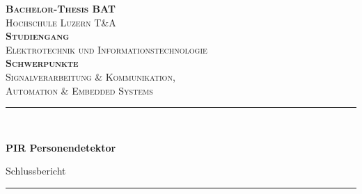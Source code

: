 \begin{titlepage}	
	\begin{center}	
		
		\textsc{\bfseries \LARGE Bachelor-Thesis BAT }\\[1.0cm]
		
		\textsc{\Large Hochschule Luzern T\&A}\\[0.5cm]
		
			\textsc{\bfseries Studiengang}\\[0.2cm]
		
		\textsc{
			Elektrotechnik und Informationstechnologie}\\[0.2cm]
		
				\textsc{\bfseries Schwerpunkte}\\[0.2cm]
		
		\textsc{	Signalverarbeitung \& Kommunikation, \\
			Automation \& Embedded Systems}\\[0.5cm]
		
		\newcommand{\HRule}{\rule{\linewidth}{0.5mm}}
		\HRule \\[1.0cm]
		{   \Huge \bfseries PIR Personendetektor\\
			\large \vspace{\baselineskip}
			
			\large Schlussbericht\\[1.0cm]
			
			\HRule \\[1.0cm]
			\large \vspace{\baselineskip}
		}
		\begingroup
		\parfillskip=0pt
		\large
		

\end{center}
\end{titlepage}
